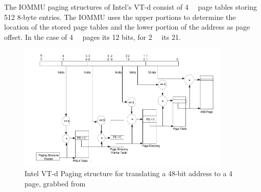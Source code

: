 The IOMMU paging structures of Intel's VT-d consist of \qty{4}{\kibi\byte} page tables storing 512 8-byte entries. The IOMMU uses the upper portions to determine the location of the stored page tables and the lower portion of the address as page offset. In the case of \qty{4}{\kibi\byte} pages its 12 bits, for \qty{2}{\mebi\byte} its 21.




\begin{figure}[H]
    \centering
    \includegraphics[width=0.9\textwidth]{figures/4kibtranslation.pdf}
    \caption{Intel VT-d Paging structure for translating a 48-bit address to a \qty{4}{\kibi\byte} page, grabbed from \cite{vtdspec}}
    \label{fig:pagewalk}
\end{figure}


